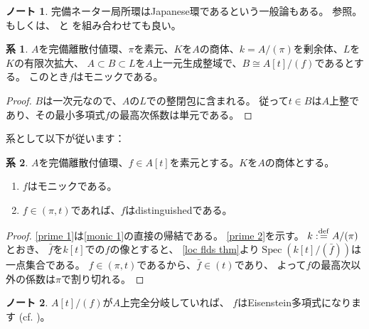 \documentclass[uplatex]{jsarticle}
\theoremstyle{definition}
\newtheorem{cor}[cor]{系}
\newtheorem*{rem*}{ノート}
\DeclareMathOperator{\Spec}{\mathrm{Spec}}
\newcommand{\dfn}{:\overset{\mathrm{\scriptsize def}}{=}}
\begin{document}
\begin{rem*}
  完備ネーター局所環はJapanese環であるという一般論もある。
  \cite[定理8.2.1]{Nag}参照。もしくは、
  \cite[\href{https://stacks.math.columbia.edu/tag/032W}{Tag 032W}]{stacks-project}と
  \cite[\href{https://stacks.math.columbia.edu/tag/0334}{Tag 0334}]{stacks-project}を組み合わせても良い。
\end{rem*}



\begin{cor}\label{monic 1}
  \(A\)を完備離散付値環、\(\pi\)を素元、\(K\)を\(A\)の商体、\(k=A/(\pi)\)を剰余体、\(L\)を\(K\)の有限次拡大、
  \(A\subset B\subset L\)を\(A\)上一元生成整域で、\(B\cong A[t]/(f)\)であるとする。
  このとき\(f\)はモニックである。
\end{cor}

\begin{proof}
  \(B\)は一次元なので、\(A\)の\(L\)での整閉包に含まれる。
  従って\(t\in B\)は\(A\)上整であり、その最小多項式\(f\)の最高次係数は単元である。
\end{proof}

系として以下が従います：

\begin{cor}\label{prime element is monic}
  \(A\)を完備離散付値環、\(f\in A[t]\)を素元とする。\(K\)を\(A\)の商体とする。
  \begin{enumerate}
    \item \label{prime 1}
    \(f\)はモニックである。
    \item \label{prime 2}
    \(f\in (\pi,t)\)であれば、\(f\)はdistinguishedである。
  \end{enumerate}
\end{cor}

\begin{proof}
  \ref{prime 1}は\autoref{monic 1}の直接の帰結である。
  \ref{prime 2}を示す。
  \(k \dfn A/(\pi)\)とおき、
  \(\bar{f}\)を\(k[t]\)での\(f\)の像とすると、
  \autoref{loc flds thm}より\(\Spec(k[t]/(\bar{f}))\)は一点集合である。
  \(f\in (\pi,t)\)であるから、\(\bar{f}\in (t)\)であり、
  よって\(f\)の最高次以外の係数は\(\pi\)で割り切れる。
\end{proof}


\begin{rem*}
  \(A[t]/(f)\)が\(A\)上完全分岐していれば、
  \(f\)はEisenstein多項式になります (cf. \cite[I. Proposition 18]{Serre})。
\end{rem*}
\end{document}
